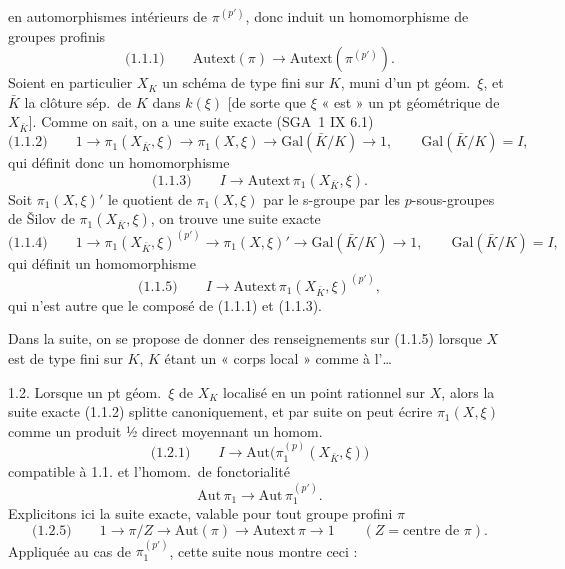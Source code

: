 \documentclass[11pt,a4paper]{article}
\begin{document}
en automorphismes intérieurs de $\pi^{(p')}$, donc induit un homomorphisme de groupes profinis
\[
\text{(1.1.1)}\qquad \mathrm{Autext}(\pi) \longrightarrow \mathrm{Autext}(\pi^{(p')}) .
\]
 Soient en particulier $X_K$ un schéma de type fini sur $K$, muni d'un pt géom.\ $\xi$, et $\bar K$ la clôture sép.\ de $K$ dans $k(\xi)$ [de sorte que $\xi$ « est » un pt géométrique de $X_{\bar K}$]. Comme on sait, on a une suite exacte (SGA~1 IX 6.1)
\[
\text{(1.1.2)}\qquad 1 \to \pi_1(X_{\bar K}, \xi) \longrightarrow \pi_1(X, \xi) \longrightarrow \mathrm{Gal}(\bar K/K) \to 1 ,
\qquad \mathrm{Gal}(\bar K/K) = I ,
\]
qui définit donc un homomorphisme
\[
\text{(1.1.3)}\qquad I \longrightarrow \mathrm{Autext}\, \pi_1(X_{\bar K}, \xi) .
\]
Soit $\pi_1(X,\xi)'$ le quotient de $\pi_1(X,\xi)$ par le s-groupe \struck{\ill{}}  par les $p$-sous-groupes de Šilov de $\pi_1(X_{\bar K}, \xi)$, on trouve une suite exacte
\[
\text{(1.1.4)}\qquad 1 \to \pi_1(X_{\bar K}, \xi)^{(p')} \longrightarrow \pi_1(X, \xi)' \longrightarrow \mathrm{Gal}(\bar K/K) \to 1 ,
\qquad \mathrm{Gal}(\bar K/K) = I ,
\]
qui définit un homomorphisme
\[
\text{(1.1.5)}\qquad I \longrightarrow \mathrm{Autext}\, \pi_1(X_{\bar K}, \xi)^{(p')} ,
\]
qui n'est autre que le composé de (1.1.1) et (1.1.3).

Dans la suite, on se propose de donner des renseignements sur (1.1.5) lorsque $X$ est de type fini sur $K$, $K$ étant un « corps local » comme à l'…

1.2. Lorsque \struck{\ill{}}  un pt géom.\ $\xi$ de $X_K$  localisé en un point rationnel sur $X$, alors la suite exacte (1.1.2) splitte canoniquement, et par suite on peut écrire $\pi_1(X, \xi)$ comme un produit ½ direct moyennant un homom.
\[
\text{(1.2.1)}\qquad I \longrightarrow \mathrm{Aut}\bigl(\pi_1^{(p)}(X_{\bar K}, \xi)\bigr)
\]
compatible à 1.1. et l'homom.\ de fonctorialité
\[
\mathrm{Aut}\, \pi_1 \longrightarrow \mathrm{Aut}\, \pi_1^{(p')} .
\]
 Explicitons ici la suite exacte, valable pour tout groupe profini $\pi$
\[
\text{(1.2.5)}\qquad 1 \to \pi/Z \longrightarrow \mathrm{Aut}(\pi) \longrightarrow \mathrm{Autext}\, \pi \to 1
\qquad (Z = \text{centre de } \pi).
\]
Appliquée au cas de $\pi_1^{(p')}$, cette suite nous montre ceci :
\end{document}
